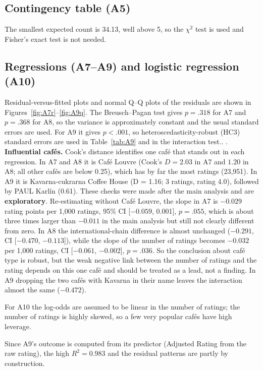 \documentclass[11pt,a4paper]{article}
\begin{document}
\subsection{Contingency table (A5)}
The smallest expected count is 34.13, well above 5, so the $\chi^2$ test is used and Fisher's exact test is not needed.

\subsection{Regressions (A7--A9) and logistic regression (A10)}
Residual-versus-fitted plots and normal Q--Q plots of the residuals are shown in Figures~\ref{fig:A7r}--\ref{fig:A9q}. The Breusch--Pagan test gives $p=.318$ for A7 and $p=.368$ for A8, so the variance is approximately constant and the usual standard errors are used. For A9 it gives $p<.001$, so heteroscedasticity-robust (HC3) standard errors are used in Table~\ref{tab:A9} and in the interaction test.. . \textbf{Influential caf\'es.} Cook's distance identifies one caf\'e that stands out in each regression. In A7 and A8 it is Caf\'e Louvre (Cook's $D=2.03$ in A7 and $1.20$ in A8; all other caf\'es are below 0.25), which has by far the most ratings (23,951). In A9 it is Kavarna-cukrarna Coffee House (D = 1.16; 3 ratings, rating 4.0), followed by PAUL Karl\'in (0.61). These checks were made after the main analysis and are \textbf{exploratory}. Re-estimating without Caf\'e Louvre, the slope in A7 is $-0.029$ rating points per 1,000 ratings, 95\% CI [$-0.059$, 0.001], $p=.055$, which is about three times larger than $-0.011$ in the main analysis but still not clearly different from zero. In A8 the international-chain difference is almost unchanged ($-0.291$, CI [$-0.470$, $-0.113$]), while the slope of the number of ratings becomes $-0.032$ per 1,000 ratings, CI [$-0.061$, $-0.002$], $p=.036$. So the conclusion about caf\'e type is robust, but the weak negative link between the number of ratings and the rating depends on this one caf\'e and should be treated as a lead, not a finding. In A9 dropping the two caf\'es with Kavarna in their name leaves the interaction almost the same ($-0.472$).

For A10 the log-odds are assumed to be linear in the number of ratings; the number of ratings is highly skewed, so a few very popular caf\'es have high leverage.

Since A9's outcome is computed from its predictor (Adjusted Rating from the raw rating), the high $R^2=0.983$ and the residual patterns are partly by construction.
\end{document}
